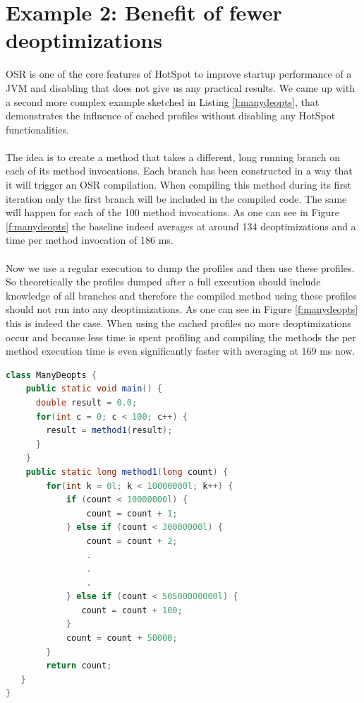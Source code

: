 \section{Example 2: Benefit of fewer deoptimizations}
\label{s:ex2}
OSR is one of the core features of HotSpot to improve startup performance of a JVM and disabling that does not give us any practical results. We came up with a second more complex example sketched in Listing \ref{l:manydeopts}, that demonstrates the influence of cached profiles without disabling any HotSpot functionalities.
\\\\
The idea is to create a method that takes a different, long running branch on each of its method invocations. Each branch has been constructed in a way that it will trigger an OSR compilation. When compiling this method during its first iteration only the first branch will be included in the compiled code. The same will happen for each of the 100 method invocations. As one can see in Figure \ref{f:manydeopts} the baseline indeed averages at around 134 deoptimizations and a time per method invocation of 186 ms.
\\\\
Now we use a regular execution to dump the profiles and then use these profiles. So theoretically the profiles dumped after a full execution should include knowledge of all branches and therefore the compiled method using these profiles should not run into any deoptimizations. As one can see in Figure \ref{f:manydeopts} this is indeed the case. When using the cached profiles no more deoptimizations occur and because less time is spent profiling and compiling the methods the per method execution time is even significantly faster with averaging at 169 ms now.
\begin{lstlisting}[float,caption=Simple method that causes many deoptimizations,label=l:manydeopts,language=Java]
class ManyDeopts {
    public static void main() {
      double result = 0.0;
      for(int c = 0; c < 100; c++) {
        result = method1(result);
      }
    }
    public static long method1(long count) {
        for(int k = 0l; k < 10000000l; k++) {
            if (count < 10000000l) {
                count = count + 1;
            } else if (count < 30000000l) {
                count = count + 2;
                .
                .
                .
            } else if (count < 50500000000l) {
               count = count + 100;
            }
            count = count + 50000;
        }
        return count;
   }
}
\end{lstlisting}
